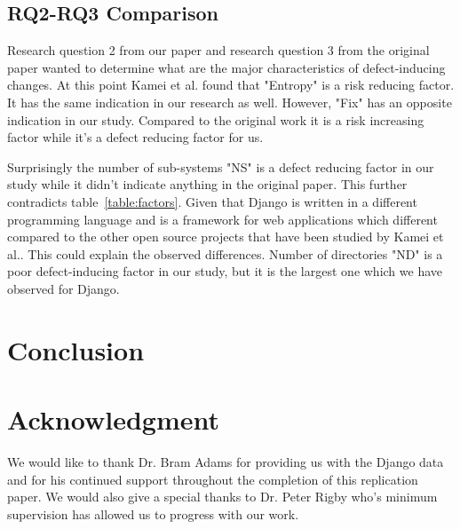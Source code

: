 \documentclass[10pt, conference]{IEEEtran}
\begin{document}
\subsection{RQ2-RQ3 Comparison}
\label{sec:comp-rq23}

Research question 2 from our paper and research question 3 from the original paper wanted to determine what are the major characteristics of defect-inducing changes. At this point Kamei et al. found that "Entropy" is a risk reducing factor. It has the same indication in our research as well. However, "Fix" has an opposite indication in our study. Compared to the original work it is a risk increasing factor while it's a defect reducing factor for us.

Surprisingly the number of sub-systems "NS" is a defect reducing factor in our study while it didn't indicate anything in the original paper. This further contradicts table~\ref{table:factors}. Given that Django is written in a different programming language and is a framework for web applications which different compared to the other open source projects that have been studied by Kamei et al.. This could explain the observed differences. Number of directories "ND" is a poor defect-inducing factor in our study, but it is the largest one which we have observed for Django. 

\section{Conclusion}
\label{sec:conclusion}



\section*{Acknowledgment}
We would like to thank Dr. Bram Adams for providing us with the Django data and for his continued support throughout the completion of this replication paper. We would also give a special thanks to Dr. Peter Rigby who's minimum supervision has allowed us to progress with our work.

\balance


\end{document}
